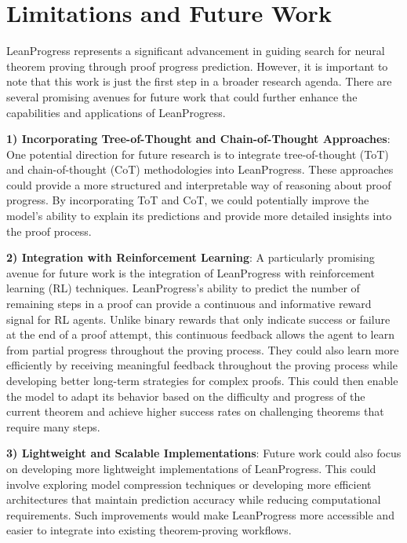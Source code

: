 \section{Limitations and Future Work}
\label{sec:conclusion}

LeanProgress represents a significant advancement in guiding search for neural theorem proving through proof progress prediction. However, it is important to note that this work is just the first step in a broader research agenda. There are several promising avenues for future work that could further enhance the capabilities and applications of LeanProgress. 

\textbf{1) Incorporating Tree-of-Thought and Chain-of-Thought Approaches}: One potential direction for future research is to integrate tree-of-thought (ToT) and chain-of-thought (CoT) methodologies into LeanProgress. These approaches could provide a more structured and interpretable way of reasoning about proof progress. By incorporating ToT and CoT, we could potentially improve the model's ability to explain its predictions and provide more detailed insights into the proof process.

\textbf{2) Integration with Reinforcement Learning}: A particularly promising avenue for future work is the integration of LeanProgress with reinforcement learning (RL) techniques. LeanProgress's ability to predict the number of remaining steps in a proof can provide a continuous and informative reward signal for RL agents. Unlike binary rewards that only indicate success or failure at the end of a proof attempt, this continuous feedback allows the agent to learn from partial progress throughout the proving process. They could also learn more efficiently by receiving meaningful feedback throughout the proving process while developing better long-term strategies for complex proofs. This could then enable the model to adapt its behavior based on the difficulty and progress of the current theorem and achieve higher success rates on challenging theorems that require many steps.

\textbf{3) Lightweight and Scalable Implementations}: Future work could also focus on developing more lightweight implementations of LeanProgress. This could involve exploring model compression techniques or developing more efficient architectures that maintain prediction accuracy while reducing computational requirements. Such improvements would make LeanProgress more accessible and easier to integrate into existing theorem-proving workflows.



